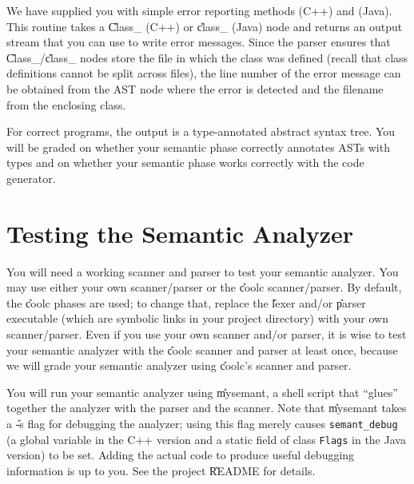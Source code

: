 \documentclass[11pt]{article}
\begin{document}
We have supplied you with simple error reporting methods
 (C++)
and
 (Java).
This routine takes a \U{Class\_} (C++) or \U{class\_} (Java) node
and returns an output stream that you can use to write error
messages.  Since the parser ensures that \U{Class\_}/\U{class\_} nodes
store the file in which the class was defined (recall that class
definitions cannot be split across files), the line number of the
error message can be obtained from the AST node where the error is
detected and the filename from the enclosing class.

For correct programs, the output is a type-annotated abstract syntax
tree.  You will be graded on whether your semantic phase correctly
annotates ASTs with types and on whether your semantic phase works
correctly with the  code generator.




\section{Testing the Semantic Analyzer}

You will need a working scanner and parser to test your semantic
analyzer. You may use either your own scanner/parser or the \U{coolc}
scanner/parser.  By default, the \U{coolc} phases are used; to change
that, replace the \U{lexer} and/or \U{parser} executable (which are
symbolic links in your project directory) with your own scanner/parser.
Even if you use your own scanner and/or parser, it is wise to test your
semantic analyzer with the \U{coolc} scanner and parser at least once,
because we will grade your semantic analyzer using \U{coolc}'s scanner
and parser.

You will run your semantic analyzer using \U{mysemant}, a shell script
that ``glues'' together the analyzer with the parser and the scanner.
Note that \U{mysemant} takes a \U{-s} flag for debugging the analyzer;
using this flag merely causes {\tt semant\_debug} (a global variable in
the C++ version and a static field of class {\tt Flags} in the Java
version) to be set.  Adding the actual code to produce useful debugging
information is up to you.  See the project \U{README} for details.
\end{document}
